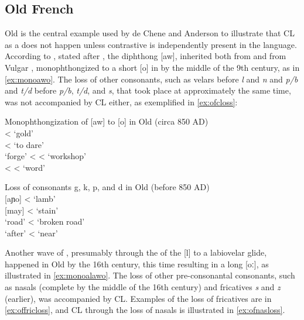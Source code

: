 \documentclass[output=paper,
modfonts
]{LSP/langsci}
\begin{document}
\subsection{Old French}

Old  is the central example used by de Chene and Anderson to
illustrate that CL as a  does not happen unless contrastive
 is independently present in the language. According to \citet[527--528]{deChene1979}, stated after \citet[79, 191]{pope1934}, the
diphthong {[}aw{]}, inherited both from  and from Vulgar
, monophthongized to a short {[}o{]} in  by the middle of the
9th century, as in \cref{ex:monoawo}. The loss of other consonants,
such as velars before \emph{l} and \emph{n} and \emph{p/b} and
\emph{t/d} before \emph{p/b}, \emph{t/d}, and \emph{s}, that took place
at approximately the same time, was not accompanied by CL either, as
exemplified in \cref{ex:ofcloss}:

\newpage 
\ea\label{ex:oldfrench1}
	\ea\label{ex:monoawo}Monophthongization of {[}aw{]} to {[}o{]} in Old  (circa 850 AD)\\
	 \textless{}  `gold'\\
	 \textless{}  `to dare'\\
	 `forge' \textless{}  \textless{}  `workshop'\\
	 \textless{}  \textless{}  `word'
	
	\ex\label{ex:ofcloss}Loss of consonants g, k, p, and d in Old  (before 850 AD)\\
	 {[}aɲo{]} \textless{}  `lamb'\\
	 {[}may{]} \textless{}  `stain'\\
	 `road' \textless{}   `broken road'\\
	 `after' \textless{}  `near'
	\z
\z

Another wave of  , presumably through the 
of the  {[}l{]} to a labiovelar glide, happened in Old  by the
16th century, this time resulting in a long {[}oː{]},
as illustrated in \cref{ex:monoalawo}. The loss of other pre-consonantal consonants,
such as nasals (complete by the middle of the 16th
century) and fricatives \emph{s} and \emph{z} (earlier), was accompanied
by CL. Examples of the loss of fricatives are in \cref{ex:offricloss}, and CL through
the loss of nasals is illustrated in \cref{ex:ofnasloss}.
\end{document}
